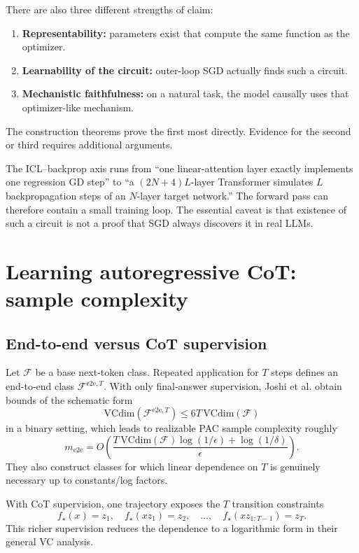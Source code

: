\documentclass[11pt,a4paper,oneside,openany]{memoir}
\theoremstyle{definition}
\begin{document}
There are also three different strengths of claim:
\begin{enumerate}
\item \textbf{Representability:} parameters exist that compute the same function as the optimizer.
\item \textbf{Learnability of the circuit:} outer-loop SGD actually finds such a circuit.
\item \textbf{Mechanistic faithfulness:} on a natural task, the model causally uses that optimizer-like mechanism.
\end{enumerate}
The construction theorems prove the first most directly.  Evidence for the second or third requires additional arguments.

\begin{presentbox}
The ICL--backprop axis runs from ``one linear-attention layer exactly implements one regression GD step'' to ``a $(2N+4)L$-layer Transformer simulates $L$ backpropagation steps of an $N$-layer target network.''  The forward pass can therefore contain a small training loop.  The essential caveat is that existence of such a circuit is not a proof that SGD always discovers it in real LLMs.
\end{presentbox}

\chapter{Learning autoregressive CoT: sample complexity}
\section{End-to-end versus CoT supervision}
Let $\mathcal F$ be a base next-token class.  Repeated application for $T$ steps defines an end-to-end class $\mathcal F^{\mathrm{e2e},T}$.  With only final-answer supervision, Joshi et al. obtain bounds of the schematic form
\[
\mathrm{VCdim}(\mathcal F^{\mathrm{e2e},T})
\le 6T\,\mathrm{VCdim}(\mathcal F)
\]
in a binary setting, which leads to realizable PAC sample complexity roughly
\[
m_{\mathrm{e2e}}
=O\!\left(
\frac{T\,\mathrm{VCdim}(\mathcal F)\log(1/\epsilon)+\log(1/\delta)}{\epsilon}
\right).
\]
They also construct classes for which linear dependence on $T$ is genuinely necessary up to constants/log factors.

With CoT supervision, one trajectory exposes the $T$ transition constraints
\[
f_\star(x)=z_1,\quad
f_\star(xz_1)=z_2,\quad\ldots,\quad
f_\star(xz_{1:T-1})=z_T.
\]
This richer supervision reduces the dependence to a logarithmic form in their general VC analysis.
\end{document}
